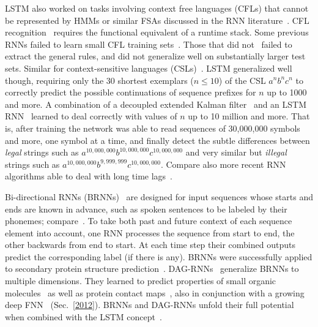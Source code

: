\documentclass[letterpaper]{article}
\begin{document}
\begin{CJK*}{UTF8}{gbsn}
LSTM also worked on tasks involving
context free languages (CFLs) that cannot be represented by HMMs or similar FSAs
discussed in the RNN literature~\citep{Sun93:abRNN,wiles95learning,andrews1995,steijvers96recurrent,tonkes97learning,Rodriguez:1999CS,Rodriguez+Wiles:1998:nips10}.
CFL recognition~\citep{lee-learning:96} requires the functional equivalent of a runtime stack.
Some previous RNNs failed to learn small
CFL training sets~\citep{Rodriguez+Wiles:1998:nips10}.
Those that did not~\citep{Rodriguez:1999CS,boden00context-free}
failed to extract the
general rules, and did not generalize
well on substantially larger test sets.
Similar for context-sensitive languages (CSLs)~\citep[e.g.,][]{ChalupBlairNN2003}.
LSTM generalized  well though,
requiring only the 30 shortest exemplars
($n \leq 10$) of the CSL $a^nb^nc^n$ to
correctly predict the possible continuations of sequence prefixes
for $n$ up to 1000 and more.
A combination of a decoupled extended Kalman filter~\citep{kalman1960,williams1992kalman,Puskorius:94,feldkamp1998kalman,haykin2001,feldkamp2003}
and an LSTM RNN~\citep{Perez:02}
learned to deal correctly with values of $n$ up to 10 million and more.
That is, after training the network was able to
read sequences of 30,000,000 symbols and more,
one symbol at a time, and
finally detect the subtle differences between
{\em legal} strings such as
$a^{10,000,000}b^{10,000,000}c^{10,000,000}$
and
very similar but {\em illegal} strings such as
$a^{10,000,000}b^{9,999,999}c^{10,000,000}$.
Compare also more recent RNN algorithms able to deal with long
time lags~\citep{DBLP:conf/icann/SchaferUZ06,Martens:2011hessfree,DBLP:series/lncs/ZimmermannTG12,icml2014}.



Bi-directional RNNs (BRNNs)~\citep{schuster97bidirectional,schuster99thesis} are designed for input sequences whose
starts and ends are known in advance, such as spoken sentences to be labeled by their phonemes; compare~\citep{fukada99boundary}. 
To take both past and future context of each sequence element into account,
one RNN processes the sequence from start to end, 
the other backwards from end to start. 
At each time step their combined outputs predict the corresponding label (if there is any).
BRNNs were successfully applied to secondary protein structure 
prediction~\citep{baldi99exploiting}.
DAG-RNNs~\citep{baldi2003jmlr,wu2008go} generalize BRNNs to multiple dimensions.
 They
learned to predict properties of small organic molecules~\citep{lusci2013}
as well as
protein contact maps~\citep{tegge2009},
also in conjunction with a growing deep FNN~\citep{baldi2012contact} (Sec.~\ref{2012}).
BRNNs and DAG-RNNs unfold their full potential when
combined with the LSTM concept~\citep{graves05nn,graves:2009nips,Graves:09tpami}.



\end{CJK*}
\end{document}
